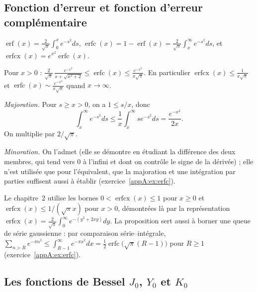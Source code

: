 \subsection{Fonction d'erreur et fonction d'erreur complémentaire}
\begin{definition}
$\operatorname{erf}(x)=\frac2{\sqrt\pi}\int_0^xe^{-s^2}ds$, $\operatorname{erfc}(x)=1-\operatorname{erf}(x)=
\frac2{\sqrt\pi}\int_x^\infty e^{-s^2}ds$, et $\operatorname{erfcx}(x)=e^{x^2}\operatorname{erfc}(x)$.
\end{definition}

\begin{proposition}\label{appA:prop:erfc}
Pour $x>0$ : $\displaystyle\frac{2}{\sqrt\pi}\,\frac{e^{-x^2}}{x+\sqrt{x^2+2}}\le\operatorname{erfc}(x)
\le\frac{e^{-x^2}}{x\sqrt\pi}$. En particulier $\operatorname{erfcx}(x)\le\frac1{x\sqrt\pi}$ et
$\operatorname{erfc}(x)\sim\frac{e^{-x^2}}{x\sqrt\pi}$ quand $x\to\infty$.
\end{proposition}

\begin{humanproof}
\emph{Majoration.} Pour $s\ge x>0$, on a $1\le s/x$, donc
\[\int_x^\infty e^{-s^2}ds\le\frac1x\int_x^\infty se^{-s^2}ds=\frac{e^{-x^2}}{2x} .\]
On multiplie par $2/\sqrt\pi$.

\emph{Minoration.} On l'admet \tierL{} (elle se démontre en étudiant la différence des deux membres, qui tend vers $0$ à
l'infini et dont on contrôle le signe de la dérivée) ; elle n'est utilisée que pour l'équivalent, que la majoration et
une intégration par parties suffisent aussi à établir (exercice~\ref{appA:ex:erfc}).
\end{humanproof}
Le chapitre~2 utilise les bornes $0<\operatorname{erfcx}(x)\le1$ pour $x\ge0$ et $\operatorname{erfcx}(x)\le1/(\sqrt\pi
x)$ pour $x>0$, démontrées là par la représentation $\operatorname{erfcx}(x)=\frac2{\sqrt\pi}\int_0^\infty
e^{-(y^2+2xy)}dy$. La proposition sert aussi à borner une queue de série gaussienne : par comparaison série--intégrale,
$\sum_{n>R}e^{-\pi n^2}\le\int_{R-1}^\infty e^{-\pi x^2}dx=\frac12\operatorname{erfc}\bigl(\sqrt\pi(R-1)\bigr)$ pour $R\ge1$
(exercice~\ref{appA:ex:erfc}).

\subsection{Les fonctions de Bessel \texorpdfstring{$J_0$}{J0}, \texorpdfstring{$Y_0$}{Y0} et \texorpdfstring{$K_0$}{K0}}

